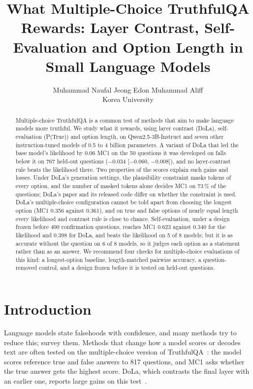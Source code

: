 \documentclass[11pt]{article}
\title{What Multiple-Choice TruthfulQA Rewards: Layer Contrast, Self-Evaluation and Option Length in Small
Language Models}
\author{Muhammad Naufal \quad Jeong Edon \quad Muhammad Aliff\\\small Korea University}
\date{}
\newcommand{\mainmodel}{Qwen2.5-3B-Instruct}
\begin{document}
\maketitle

\begin{abstract}
Multiple-choice TruthfulQA is a common test of methods that aim to make language models more truthful. We
study what it rewards, using layer contrast (DoLa), self-evaluation (P(True)) and option length, on
\mainmodel{} and seven other instruction-tuned models of 0.5 to 4 billion parameters. A variant of DoLa that led
the base model's likelihood by 0.06 MC1 on the 50 questions it was developed on falls below it on 767 held-out
questions ($-0.034$ [$-0.060$, $-0.008$]), and no layer-contrast rule beats the likelihood there. Two properties
of the scores explain such gains and losses. Under DoLa's generation settings, the plausibility constraint masks
tokens of every option, and the number of masked tokens alone decides MC1 on 73\,\% of the questions; DoLa's paper
and its released code differ on whether the constraint is used. DoLa's multiple-choice configuration cannot be told
apart from choosing the longest option (MC1 0.356 against 0.361), and on true and false options of nearly equal
length every likelihood and contrast rule is close to chance. Self-evaluation, under a design frozen before 400
confirmation questions, reaches MC1 0.623 against 0.340 for the likelihood and 0.398 for DoLa, and beats the
likelihood on 5 of 8 models; but it is as accurate without the question on 6 of 8 models, so it judges each option
as a statement rather than as an answer. We recommend four checks for multiple-choice evaluations of this kind: a
longest-option baseline, length-matched pairwise accuracy, a question-removed control, and a design frozen before
it is tested on held-out questions.
\end{abstract}

\section{Introduction}
\label{sec:intro}
Language models state falsehoods with confidence, and many methods try to reduce this; \citet{huang2025survey}
survey them. Methods that change how a model scores or decodes text are often tested on the multiple-choice version
of TruthfulQA~\citep{lin2022truthfulqa}: the model scores reference true and false answers to 817 questions, and MC1
asks whether the true answer gets the highest score. DoLa, which contrasts the final layer with an earlier one,
reports large gains on this test~\citep{chuang2024dola}.
\end{document}
